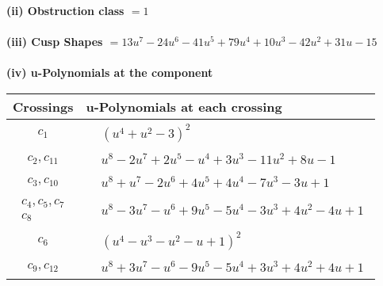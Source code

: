 \documentclass[1p]{elsarticle_modified}
\theoremstyle{definition}
\begin{document}
\flushleft \textbf{(ii) Obstruction class $= 1$}\\~\\
\flushleft \textbf{(iii) Cusp Shapes $= 13 u^7-24 u^6-41 u^5+79 u^4+10 u^3-42 u^2+31 u-15$}\\~\\
\newpage\renewcommand{\arraystretch}{1}
\flushleft \textbf{(iv) u-Polynomials at the component}\newline \\
\begin{tabular}{m{50pt}|m{274pt}}
Crossings & \hspace{64pt}u-Polynomials at each crossing \\
\hline $$\begin{aligned}c_{1}\end{aligned}$$&$\begin{aligned}
&(u^4+u^2-3)^2
\end{aligned}$\\
\hline $$\begin{aligned}c_{2},c_{11}\end{aligned}$$&$\begin{aligned}
&u^8-2 u^7+2 u^5- u^4+3 u^3-11 u^2+8 u-1
\end{aligned}$\\
\hline $$\begin{aligned}c_{3},c_{10}\end{aligned}$$&$\begin{aligned}
&u^8+u^7-2 u^6+4 u^5+4 u^4-7 u^3-3 u+1
\end{aligned}$\\
\hline $$\begin{aligned}c_{4},c_{5},c_{7}\\c_{8}\end{aligned}$$&$\begin{aligned}
&u^8-3 u^7- u^6+9 u^5-5 u^4-3 u^3+4 u^2-4 u+1
\end{aligned}$\\
\hline $$\begin{aligned}c_{6}\end{aligned}$$&$\begin{aligned}
&(u^4- u^3- u^2- u+1)^2
\end{aligned}$\\
\hline $$\begin{aligned}c_{9},c_{12}\end{aligned}$$&$\begin{aligned}
&u^8+3 u^7- u^6-9 u^5-5 u^4+3 u^3+4 u^2+4 u+1
\end{aligned}$\\
\hline
\end{tabular}\\~\\
\end{document}
